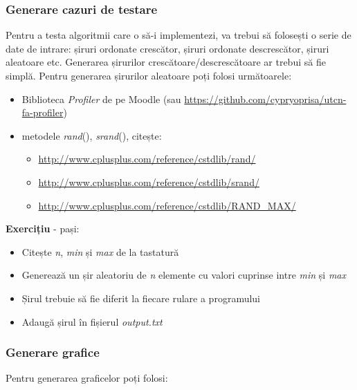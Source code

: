 \documentclass[../ro-fa-lab.tex]{subfiles}
\begin{document}
\subsubsection{Generare cazuri de
testare}\label{generare-cazuri-de-testare}

Pentru a testa algoritmii care o să-i implementezi, va trebui să
folosești o serie de date de intrare: șiruri ordonate crescător, șiruri
ordonate descrescător, șiruri aleatoare etc. Generarea șirurilor
crescătoare/descrescătoare ar trebui să fie simplă. Pentru generarea
șirurilor aleatoare poți folosi următoarele:

\begin{itemize}
\item
  Biblioteca \emph{Profiler} de pe Moodle (sau
  \url{https://github.com/cypryoprisa/utcn-fa-profiler})
\end{itemize}

\begin{itemize}
\item
  metodele \emph{rand}(), \emph{srand}(), citește:

  \begin{itemize}
  \item
    \url{http://www.cplusplus.com/reference/cstdlib/rand/}
  \item
    \url{http://www.cplusplus.com/reference/cstdlib/srand/}
  \item
    \url{http://www.cplusplus.com/reference/cstdlib/RAND_MAX/}
  \end{itemize}
\end{itemize}

\textbf{Exercițiu} - pași:

\begin{itemize}
\item
  Citește \emph{n}, \emph{min} și \emph{max} de la tastatură
\item
  Generează un șir aleatoriu de \emph{n} elemente cu valori cuprinse
  intre \emph{min} și \emph{max}
\item
  Șirul trebuie să fie diferit la fiecare rulare a programului
\item
  Adaugă șirul în fișierul \emph{output.txt}
\end{itemize}

\subsubsection{Generare grafice}\label{generare-grafice}

Pentru generarea graficelor poți folosi:
\end{document}
